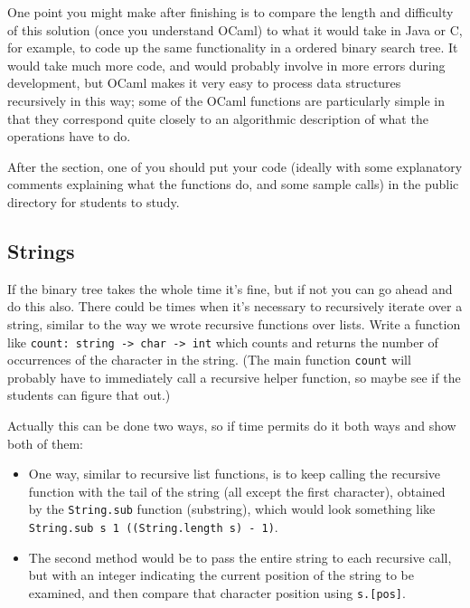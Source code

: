 \documentclass[12pt]{article}
\begin{document}
      \vspace{-2mm}

      One point you might make after finishing is to compare the length and
    difficulty of this solution (once you understand OCaml) to what it would
    take in Java or C, for example, to code up the same functionality in a
    ordered binary search tree.  It would take much more code, and would
    probably involve in more errors during development, but OCaml makes it
    very easy to process data structures recursively in this way; some of
    the OCaml functions are particularly simple in that they correspond
    quite closely to an algorithmic description of what the operations have
    to do.

      After the section, one of you should put your code (ideally with some
    explanatory comments explaining what the functions do, and some sample
    calls) in the public directory for students to study.

    \subsection{Strings}

      If the binary tree takes the whole time it's fine, but if not you can go
    ahead and do this also.  There could be times when it's necessary to
    recursively iterate over a string, similar to the way we wrote recursive
    functions over lists.  Write a function like \texttt{count: string ->
      char -> int} which counts and returns the number of occurrences of the
    character in the string.  (The main function \texttt{count} will
    probably have to immediately call a recursive helper function, so maybe
    see if the students can figure that out.)

      Actually this can be done two ways, so if time permits do it both ways
    and show both of them:

      \vspace{-1mm}

      \begin{itemize}

        \addtolength{\itemsep}{-1mm}

        \item One way, similar to recursive list functions, is to keep
              calling the recursive function with the tail of the string
              (all except the first character), obtained by the
              \texttt{String.sub} function (substring), which would look
              something like
              \texttt{String.sub s 1 ((String.length s) - 1)}.

        \item The second method would be to pass the entire string to each
              recursive call, but with an integer indicating the current
              position of the string to be examined, and then compare that
              character position using \texttt{s.[pos]}.

      \end{itemize}
\end{document}
